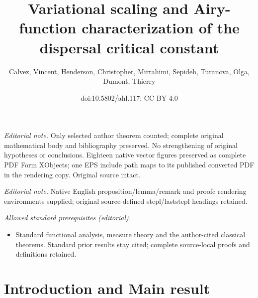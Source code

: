 \documentclass[10pt]{amsart}
\title{Variational scaling and Airy-function characterization of the dispersal critical constant}
\author{Calvez, Vincent, Henderson, Christopher, Mirrahimi, Sepideh, Turanova, Olga, Dumont, Thierry}
\date{doi:10.5802/ahl.117; CC BY 4.0}
\theoremstyle{definition}\newtheorem{defi}[theo]{Definition}\newtheorem{rema}[theo]{Remark}\newtheorem{exam}[theo]{Example}\newtheorem{exem}[theo]{Example}\newtheorem{nota}[theo]{Notation}
\newcommand{\1}{\mathds{1}}
\begin{document}
\maketitle
\noindent\textit{Editorial note.} Only selected author theorem counted; complete original mathematical body and bibliography preserved. No strengthening of original hypotheses or conclusions. Eighteen native vector figures preserved as complete PDF Form XObjects; one EPS include path maps to its published converted PDF in the rendering copy. Original source intact.\par\medskip
\noindent\textit{Editorial note.} Native English proposition/lemma/remark and proofc rendering environments supplied; original source-defined stepl/laststepl headings retained.\par\medskip
\noindent\textit{Allowed standard prerequisites (editorial).}\begin{itemize}
\item Standard functional analysis, measure theory and the author-cited classical theorems. Standard prior results stay cited; complete source-local proofs and definitions retained.
\end{itemize}\medskip



\section{Introduction and Main result}\label{sec:intro}
\end{document}
